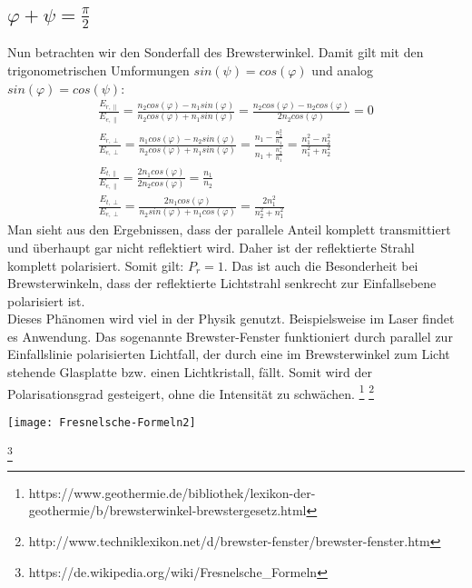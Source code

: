 \subsection*{$\varphi+\psi=\frac{\pi}{2}$}
Nun betrachten wir den Sonderfall des Brewsterwinkel. Damit gilt mit den trigonometrischen Umformungen $sin(\psi)=cos(\varphi)$ und analog $sin(\varphi)=cos(\psi)$:
\begin{align*}
\frac{E_{r,\parallel}}{E_{e,\parallel}}=\frac{n_2cos(\varphi)-n_1sin(\varphi)}{n_2cos(\varphi)+n_1sin(\varphi)}= \frac{n_2cos(\varphi)-n_2cos(\varphi)}{2n_2cos(\varphi)}=0\\
\frac{E_{r,\perp}}{E_{e,\perp}}=\frac{n_1cos(\varphi)-n_2sin(\varphi)}{n_2cos(\varphi)+n_1sin(\varphi)}=\frac{n_1-\frac{n_2^2}{n_1}}{n_1+\frac{n_2^2}{n_1}}=\frac{n_1^2-n_2^2}{n_1^2+n_2^2}\\
\frac{E_{t,\parallel}}{E_{e,\parallel}}=\frac{2n_1cos(\varphi)}{2n_2cos(\varphi)}=\frac{n_1}{n_2}\\
\frac{E_{t,\perp}}{E_{e,\perp}}=\frac{2n_1cos(\varphi)}{n_2sin(\varphi)+n_1cos(\varphi)}=\frac{2n^2_1}{n_2^2+n_1^2}
\end{align*}
Man sieht aus den Ergebnissen, dass der parallele Anteil komplett transmittiert und überhaupt gar nicht reflektiert wird. Daher ist der reflektierte Strahl komplett polarisiert. Somit gilt: $P_r=1$. Das ist auch die Besonderheit bei Brewsterwinkeln, dass der reflektierte Lichtstrahl senkrecht zur Einfallsebene polarisiert ist. \\
Dieses Phänomen wird viel in der Physik genutzt. Beispielsweise im Laser findet es Anwendung. Das sogenannte Brewster-Fenster funktioniert durch parallel zur Einfallslinie polarisierten Lichtfall, der durch eine im Brewsterwinkel zum Licht stehende Glasplatte bzw. einen Lichtkristall, fällt. Somit wird der Polarisationsgrad gesteigert, ohne die Intensität zu schwächen.  
\footnote{https://www.geothermie.de/bibliothek/lexikon-der-geothermie/b/brewsterwinkel-brewstergesetz.html}
\footnote{http://www.techniklexikon.net/d/brewster-fenster/brewster-fenster.htm}




\texttt{[image: Fresnelsche-Formeln2]}

\footnote{https://de.wikipedia.org/wiki/Fresnelsche_Formeln}






